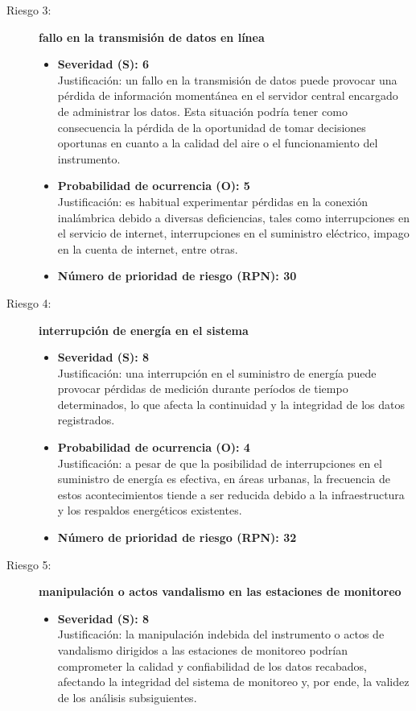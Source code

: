 \begin{description}
	
	\item[Riesgo 3:] \textbf{fallo en la transmisión de datos en línea}
	\begin{itemize}
		\item \textbf{Severidad (S): 6} \\
		Justificación: un fallo en la transmisión de datos puede provocar una pérdida de información momentánea en el servidor central encargado de administrar los datos. Esta situación podría tener como consecuencia la pérdida de la oportunidad de tomar decisiones oportunas en cuanto a la calidad del aire o el funcionamiento del instrumento.
		
		\item \textbf{Probabilidad de ocurrencia (O): 5} \\
		Justificación: es habitual experimentar pérdidas en la conexión inalámbrica debido a diversas deficiencias, tales como interrupciones en el servicio de internet, interrupciones en el suministro eléctrico, impago en la cuenta de internet, entre otras.
		
		\item \textbf{Número de prioridad de riesgo (RPN): 30} \\
	\end{itemize}
	
	
	\item[Riesgo 4:] \textbf{interrupción de energía en el sistema}
	\begin{itemize}
		\item \textbf{Severidad (S): 8} \\
		Justificación: una interrupción en el suministro de energía puede provocar pérdidas de medición durante períodos de tiempo determinados, lo que afecta la continuidad y la integridad de los datos registrados.
		
		\item \textbf{Probabilidad de ocurrencia (O): 4} \\
		Justificación: a pesar de que la posibilidad de interrupciones en el suministro de energía es efectiva, en áreas urbanas, la frecuencia de estos acontecimientos tiende a ser reducida debido a la infraestructura y los respaldos energéticos existentes.
		
		\item \textbf{Número de prioridad de riesgo (RPN): 32} \\
		
	\end{itemize}
	
	
	\item[Riesgo 5:] \textbf{manipulación o actos vandalismo en las estaciones de monitoreo}
	\begin{itemize}
		\item \textbf{Severidad (S): 8} \\
		Justificación: la manipulación indebida del instrumento o actos de vandalismo dirigidos a las estaciones de monitoreo podrían comprometer la calidad y confiabilidad de los datos recabados, afectando la integridad del sistema de monitoreo y, por ende, la validez de los análisis subsiguientes.
		

\end{itemize}
\end{description}
